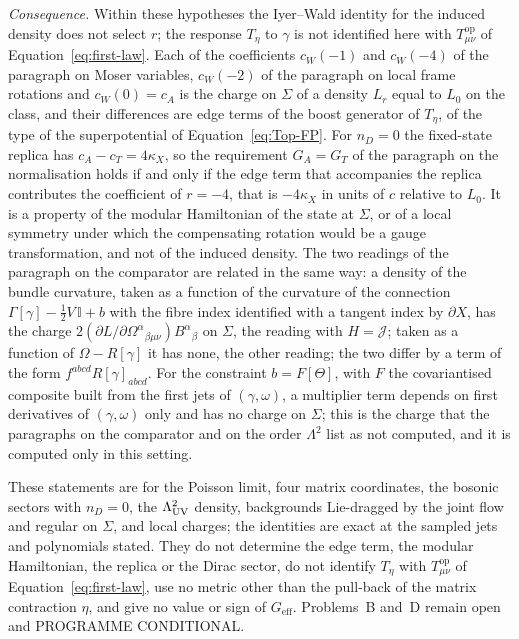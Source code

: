 \emph{Consequence.} Within these hypotheses the Iyer--Wald identity for the induced density does not select \(r\); the response \(T_\eta\) to \(\gamma\) is not identified here with \(T^{\mathrm{op}}_{\mu\nu}\) of Equation~\eqref{eq:first-law}. Each of the coefficients \(c_W(-1)\) and \(c_W(-4)\) of the paragraph on Moser variables, \(c_W(-2)\) of the paragraph on local frame rotations and \(c_W(0)=c_A\) is the charge on \(\Sigma\) of a density \(L_r\) equal to \(L_0\) on the class, and their differences are edge terms of the boost generator of \(T_\eta\), of the type of the superpotential of Equation~\eqref{eq:Top-FP}. For \(n_D=0\) the fixed-state replica has \(c_A-c_T=4\kappa_X\), so the requirement \(G_A=G_T\) of the paragraph on the normalisation holds if and only if the edge term that accompanies the replica contributes the coefficient of \(r=-4\), that is \(-4\kappa_X\) in units of \(c\) relative to \(L_0\). It is a property of the modular Hamiltonian of the state at \(\Sigma\), or of a local symmetry under which the compensating rotation would be a gauge transformation, and not of the induced density. The two readings of the paragraph on the comparator are related in the same way: a density of the bundle curvature, taken as a function of the curvature of the connection \(\Gamma[\gamma]-\tfrac12V\,\mathbb I+b\) with the fibre index identified with a tangent index by \(\partial X\), has the charge \(2(\partial L/\partial\Omega^\alpha{}_{\beta\mu\nu})B^\alpha{}_\beta\) on \(\Sigma\), the reading with \(H=\mathcal J\); taken as a function of \(\Omega-R[\gamma]\) it has none, the other reading; the two differ by a term of the form \(f^{abcd}R[\gamma]_{abcd}\). For the constraint \(b=F[\Theta]\), with \(F\) the covariantised composite built from the first jets of \((\gamma,\omega)\), a multiplier term depends on first derivatives of \((\gamma,\omega)\) only and has no charge on \(\Sigma\); this is the charge that the paragraphs on the comparator and on the order \(\Lambda^2\) list as not computed, and it is computed only in this setting.

These statements are for the Poisson limit, four matrix coordinates, the bosonic sectors with \(n_D=0\), the \(\Lambda_{\mathrm{UV}}^2\) density, backgrounds Lie-dragged by the joint flow and regular on \(\Sigma\), and local charges; the identities are exact at the sampled jets and polynomials stated. They do not determine the edge term, the modular Hamiltonian, the replica or the Dirac sector, do not identify \(T_\eta\) with \(T^{\mathrm{op}}_{\mu\nu}\) of Equation~\eqref{eq:first-law}, use no metric other than the pull-back of the matrix contraction \(\eta\), and give no value or sign of \(G_{\mathrm{eff}}\). Problems~B and~D remain open and PROGRAMME CONDITIONAL.

